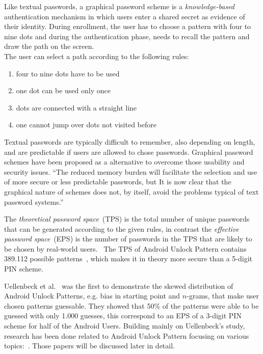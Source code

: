 \documentclass[twocolumn, a4paper, 10pt]{article}
\begin{document}
Like textual passwords, a graphical password scheme is a \textit{knowledge-based} authentication mechanism in which users enter a shared secret as evidence of their identity. During enrollment, the user has to choose a pattern with four to nine dots and during the authentication phase, needs to recall the pattern and draw the path on the screen.\\

The user can select a path according to the following rules:

\begin{enumerate}
	\small
	\item four to nine dots have to be used
	\item one dot can be used only once
	\item dots are connected with a straight line
	\item one cannot jump over dots not visited before
\end{enumerate}

Textual passwords are typically difficult to remember, also depending on length, and are predictable if users are allowed to chose passwords. Graphical password schemes have been proposed as a alternative to overcome those usability and security issues. ``The reduced memory burden will facilitate the selection and use of more secure or less predictable passwords, but It is now clear that the graphical nature of schemes does not, by itself, avoid the problems typical of text password systems.''~\cite{Biddle:2012:GPL:2333112.2333114}

The \textit{theoretical password space}~(TPS) is the total number of unique passwords that can be generated according to the given rules, in contrast the \textit{effective password space}~(EPS)  is the number of passwords in the TPS that are likely to be chosen by real-world users.~\cite{forget2007persuasion} The TPS of Android Unlock Pattern contains 389.112 possible patterns~\cite{Aviv:2010:SAS:1925004.1925009}, which makes it in theory more secure than a 5-digit PIN scheme.

Uellenbeck et al.~\cite{Uellenbeck:2013:QSG:2508859.2516700} was the first to demonstrate the skewed distribution of Android Unlock Patterns, e.g. bias in starting point and $n$-grams, that make user chosen patterns guessable. They showed that 50\% of the patterns were able to be guessed with only 1.000 guesses, this correspond to an EPS of a 3-digit PIN scheme for half of the Android Users. Building mainly on Uellenbeck's study, research has been done related to Android Unlock Pattern focusing on various topics:~\cite{Sun2014308, siadati2015fortifying, Aviv:2014:UVP:2664243.2664253, Andriotis:2013:PSS:2462096.2462098}. Those papers will be discussed later in detail.
\end{document}
